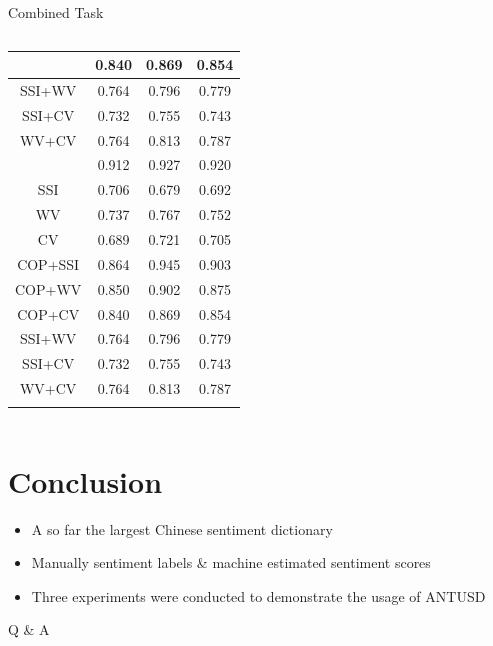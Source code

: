 \documentclass[compress]{beamer}
\begin{document}
\begin{frame}{Combined Task}
\begin{columns}
\begin{column}[T]{.6\textwidth}
\begin{table}
\begin{tabular}{cccc}
{                        COP+CV     & 0.840     & 0.869  & 0.854   \\ \hline
                        SSI+WV     & 0.764     & 0.796  & 0.779   \\ \hline
                        SSI+CV     & 0.732     & 0.755  & 0.743   \\ \hline
                        WV+CV      & 0.764     & 0.813  & 0.787   \\ \hline
                    }
                    \only<3>{
                        COP        & 0.912     & 0.927  & 0.920   \\ \hline
                        SSI        & 0.706     & 0.679  & 0.692   \\ \hline
                        WV         & 0.737     & 0.767  & \cellcolor{green}0.752   \\ \hline
                        CV         & 0.689     & 0.721  & \cellcolor{green}0.705   \\ \hline
                        COP+SSI    & 0.864     & 0.945  & 0.903   \\ \hline
                        COP+WV     & 0.850     & 0.902  & 0.875   \\ \hline
                        COP+CV     & 0.840     & 0.869  & 0.854   \\ \hline
                        SSI+WV     & 0.764     & 0.796  & 0.779   \\ \hline
                        SSI+CV     & 0.732     & 0.755  & 0.743   \\ \hline
                        WV+CV      & 0.764     & 0.813  & \cellcolor{red}0.787   \\ \hline
                    }
                    \end{tabular}
                    \end{table}
                \end{column}
            \end{columns}
        \end{frame}

\section{Conclusion}
    \begin{frame}{\secname}
        \begin{itemize}
            \item A so far the largest Chinese sentiment dictionary
            \item Manually sentiment labels \& machine estimated sentiment scores 
            \item Three experiments were conducted to demonstrate the usage of ANTUSD
        \end{itemize}
    \end{frame}

    \begin{frame}{}
        \begin{center}
            \huge
            Q \& A
        \end{center}
    \end{frame}
\end{document}
